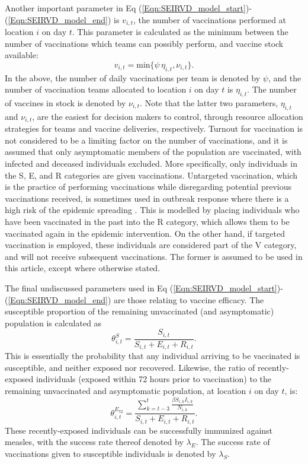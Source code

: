 \documentclass[10pt,letterpaper]{article}
\begin{document}
Another important parameter in Eq (\ref{Eqn:SEIRVD_model_start})-(\ref{Eqn:SEIRVD_model_end}) is $v_{i,t}$, the number of vaccinations performed at location $i$ on day $t$. This parameter is calculated as the minimum between the number of vaccinations which teams can possibly perform, and vaccine stock available: $$v_{i,t} = \text{min} \{\psi\,\eta_{i,t}, \nu_{i,t} \}.$$ In the above, the number of daily vaccinations per team is denoted by $\psi$, and the number of vaccination teams allocated to location $i$ on day $t$ is $\eta_{i,t}$. The number of vaccines in stock is denoted by $\nu_{i,t}$. Note that the latter two parameters, $\eta_{i,t}$ and $\nu_{i,t}$, are the easiest for decision makers to control, through resource allocation strategies for teams and vaccine deliveries, respectively. 
Turnout for vaccination is not considered to be a limiting factor on the number of vaccinations, and it is assumed that only asymptomatic members of the population are vaccinated, with infected and deceased individuals excluded. More specifically, only individuals in the S, E, and R categories are given vaccinations. Untargeted vaccination, which is the practice of performing vaccinations while disregarding potential previous vaccinations received, is sometimes used in outbreak response where there is a high risk of the epidemic spreading \cite{danet_fermon_2013}. This is modelled by placing individuals who have been vaccinated in the past into the R category, which allows them to be vaccinated again in the epidemic intervention. On the other hand, if targeted vaccination is employed, these individuals are considered part of the V category, and will not receive subsequent vaccinations. The former is assumed to be used in this article, except where otherwise stated.

The final undiscussed parameters used in Eq  (\ref{Eqn:SEIRVD_model_start})-(\ref{Eqn:SEIRVD_model_end}) are those relating to vaccine efficacy. The susceptible proportion of the remaining unvaccinated (and asymptomatic) population is calculated as $$\theta^{S}_{i,t} = \frac{S_{i,t}}{S_{i,t}+E_{i,t}+R_{i,t}}.$$ This is essentially the probability that any individual arriving to be vaccinated is susceptible, and neither exposed nor recovered. Likewise, the ratio of recently-exposed individuals (exposed within 72 hours prior to vaccination) to the remaining unvaccinated and asymptomatic population, at location $i$ on day $t$, is: $$\theta^{E_{72}}_{i,t} = \frac{\sum^{t}_{k=t-3} \frac{\beta S_{i,k}I_{i,k}}{N_{i,k}}}{S_{i,t}+E_{i,t}+R_{i,t}}.$$ 
These recently-exposed individuals can be successfully immunized against measles, with the success rate thereof denoted by $\lambda_{E}$. The success rate of vaccinations given to susceptible individuals is denoted by $\lambda_{S}$.
\end{document}
